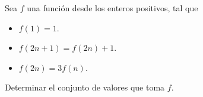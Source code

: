Sea $f$ una función desde los enteros positivos, tal que 
 \begin{itemize} 
 \item $f(1)=1$.
 \item $f(2n+1)=f(2n)+1$.
 \item $f(2n)=3f(n)$.
 \end{itemize} 
Determinar el conjunto de valores que toma $f$.
